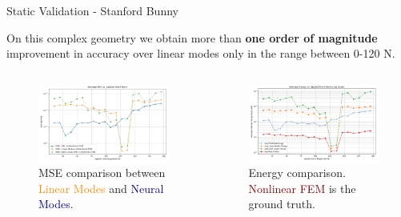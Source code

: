 \documentclass[9pt]{beamer}
\begin{document}
\begin{frame}{Static Validation - Stanford Bunny}
    
    On this complex geometry we obtain more than \textbf{one order of magnitude} improvement in accuracy over linear modes only in the range between 0-120 N. 
    \vspace{-1em}

    \begin{columns}[T]
        \begin{column}{0.5\textwidth}
   
            \begin{figure}
                \includegraphics[width=\textwidth]{Images/bunny_static_mse.png}
                \caption{MSE comparison between \textcolor{darkorange}{Linear Modes} and \textcolor{darkblue}{Neural Modes}.}
            \end{figure}
        \end{column}
        
        \begin{column}{0.5\textwidth}
            \begin{figure}
                \includegraphics[width=\textwidth]{Images/bunny_static_energy.png}
                \caption{Energy comparison. \textcolor{darkred}{Nonlinear FEM} is the ground truth.}
            \end{figure}
        \end{column}
    \end{columns}
\end{frame}
\end{document}
